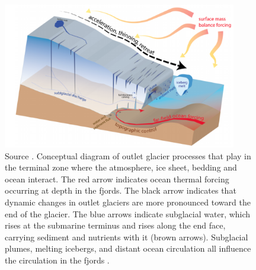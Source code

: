\documentclass[11pt,a4paper]{article}
\begin{document}
	\begin{figure}[H]
	    \centering 
	    \includegraphics[width=10.2cm]{diagram.png}
	    \caption{Source \cite{catania2020future}. Conceptual diagram of outlet glacier processes that play in the terminal zone where the atmosphere, ice sheet, bedding and ocean interact. The red arrow indicates ocean thermal forcing occurring at depth in the fjords. The black arrow indicates that dynamic changes in outlet glaciers are more pronounced toward the end of the glacier. The blue arrows indicate subglacial water, which rises at the submarine terminus and rises along the end face, carrying sediment and nutrients with it (brown arrows). Subglacial plumes, melting icebergs, and distant ocean circulation all influence the circulation in the fjords \citep{catania2020future}.}
	\end{figure}
	
\end{document}
